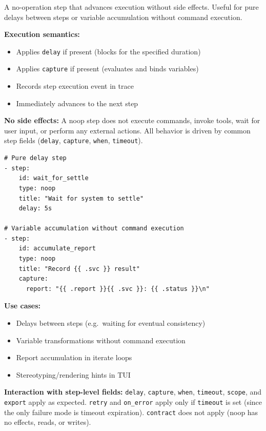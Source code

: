 A no-operation step that advances execution without side effects.  Useful for pure
delays between steps or variable accumulation without command execution.

\textbf{Execution semantics:}

\begin{itemize}
  \item Applies \texttt{delay} if present (blocks for the specified duration)
  \item Applies \texttt{capture} if present (evaluates and binds variables)
  \item Records step execution event in trace
  \item Immediately advances to the next step
\end{itemize}

\textbf{No side effects:} A noop step does not execute commands, invoke tools, wait for
user input, or perform any external actions.  All behavior is driven by common step
fields (\texttt{delay}, \texttt{capture}, \texttt{when}, \texttt{timeout}).

\begin{verbatim}
# Pure delay step
- step:
    id: wait_for_settle
    type: noop
    title: "Wait for system to settle"
    delay: 5s

# Variable accumulation without command execution
- step:
    id: accumulate_report
    type: noop
    title: "Record {{ .svc }} result"
    capture:
      report: "{{ .report }}{{ .svc }}: {{ .status }}\n"
\end{verbatim}

\textbf{Use cases:}

\begin{itemize}
  \item Delays between steps (e.g.\ waiting for eventual consistency)
  \item Variable transformations without command execution
  \item Report accumulation in iterate loops
  \item Stereotyping/rendering hints in TUI
\end{itemize}

\textbf{Interaction with step-level fields:}
\texttt{delay}, \texttt{capture}, \texttt{when}, \texttt{timeout}, \texttt{scope}, and
\texttt{export} apply as expected. \texttt{retry} and \texttt{on\_error} apply only if
\texttt{timeout} is set (since the only failure mode is timeout expiration).
\texttt{contract} does not apply (noop has no effects, reads, or writes).


